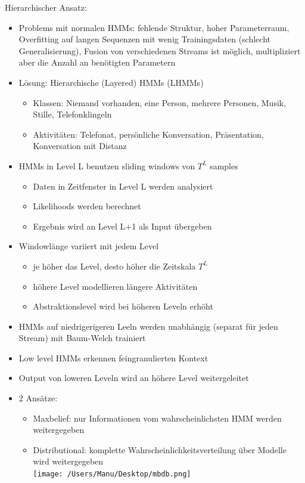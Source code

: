 \documentclass[paper=a4, fontsize=11pt]{scrartcl} %
\numberwithin{equation}{section} %
\numberwithin{figure}{section} %
\numberwithin{table}{section} %
\begin{document}
Hierarchischer Ansatz:
\begin{itemize}
\item Problems mit normalen HMMs: fehlende Struktur, hoher Parameterraum, Overfitting auf langen Sequenzen mit wenig Trainingsdaten (schlecht Generalisierung), Fusion von verschiedenen Streams ist möglich, multipliziert aber die Anzahl an benötigten Parametern
\item Lösung: Hierarchische (Layered) HMMs (LHMMs)
\begin{itemize}
\item Klassen: Niemand vorhanden, eine Person, mehrere Personen, Musik, Stille, Telefonklingeln
\item Aktivitäten: Telefonat, persönliche Konversation, Präsentation, Konversation mit Distanz
\end{itemize}
\item HMMs in Level L benutzen sliding windows von $T^L$ samples
\begin{itemize}
\item Daten in Zeitfenster in Level L werden analysiert
\item Likelihoods werden berechnet
\item Ergebnis wird an Level L+1 als Input übergeben
\end{itemize}
\item Windowlänge variiert mit jedem Level
\begin{itemize}
\item je höher das Level, desto höher die Zeitskala $T^L$
\item höhere Level modellieren längere Aktivitäten
\item Abstraktionslevel wird bei höheren Leveln erhöht
\end{itemize}
\item HMMs auf niedrigerigeren Leeln werden unabhängig (separat für jeden Stream) mit Baum-Welch trainiert
\item Low level HMMs erkennen feingranulierten Kontext
\item Output von loweren Leveln wird an höhere Level weitergeleitet
\item 2 Ansätze:
\begin{itemize}
\item Maxbelief: nur Informationen vom wahrscheinlichsten HMM werden weitergegeben
\item Distributional: komplette Wahrscheinlichkeitsverteilung über Modelle wird weitergegeben\\ 
\texttt{[image: /Users/Manu/Desktop/mbdb.png]}
\end{itemize}
\end{itemize}
\end{document}
